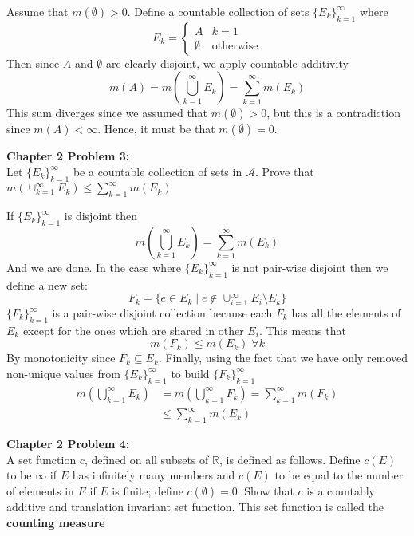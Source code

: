 \documentclass[11pt]{article}
\begin{document}
    Assume that $m(\emptyset) > 0$.
    Define a countable collection of sets $\{ E_k \}_{k=1}^{\infty}$ where
    \[
        E_k = \begin{cases}
                  A & k = 1 \\
                  \emptyset & \text{otherwise}
        \end{cases}
    \]
    Then since $A$ and $\emptyset$ are clearly disjoint, we apply countable additivity
    \[
        m(A) = m \left( \bigcup_{k=1}^{\infty} E_k \right) = \sum_{k=1}^{\infty} m(E_k)
    \]
    This sum diverges since we assumed that $m(\emptyset) > 0$, but this is a contradiction since $m(A) < \infty$.
    Hence, it must be that $m(\emptyset) = 0$.

    \clearpage

    \begin{mybox}
        \textbf{Chapter 2 Problem 3:} \\
        Let $\{ E_k \}_{k=1}^{\infty}$ be a countable collection of sets in $\mathcal{A}$.
        Prove that $m(\cup_{k=1}^{\infty} E_k) \leq \sum_{k=1}^{\infty} m(E_k)$
    \end{mybox}

    If $\{ E_k \}_{k=1}^{\infty}$ is disjoint then
    \[
        m \left( \bigcup_{k=1}^{\infty} E_k \right) = \sum_{k=1}^{\infty} m(E_k)
    \]
    And we are done.
    In the case where $\{ E_k \}_{k=1}^{\infty}$ is not pair-wise disjoint then we define a new set:
    \[
        F_k = \{ e \in E_k \mid e \notin \cup _{i=1}^{\infty} E_i \setminus E_k \}
    \]
    $\{ F_k \}_{k=1}^{\infty}$ is a pair-wise disjoint collection because each $F_k$ has all the elements of $E_k$ except for the ones which are shared in other $E_i$.
    This means that
    \[
        m(F_k) \leq m(E_k) \; \forall k
    \]
    By monotonicity since $F_k \subseteq E_k$.
    Finally, using the fact that we have only removed non-unique values from $\{ E_k \}_{k=1}^{\infty}$ to build $\{ F_k \}_{k=1}^{\infty}$
    \begin{align*}
        m(\bigcup_{k=1}^{\infty} E_k) &= m(\bigcup_{k=1}^{\infty} F_k) = \sum_{k=1}^{\infty} m(F_k) \tag{$F_k$ disjoint} \\
        &\leq \sum_{k=1}^{\infty} m(E_k)
    \end{align*}

    \clearpage

    \begin{mybox}
        \textbf{Chapter 2 Problem 4:} \\
        A set function $c$, defined on all subsets of $\mathbb{R}$, is defined as follows.
        Define $c(E)$ to be $\infty$ if $E$ has infinitely many members and $c(E)$ to be equal to the number of elements in $E$ if $E$ is finite;
        define $c(\emptyset) = 0$.
        Show that $c$ is a countably additive and translation invariant set function.
        This set function is called the \textbf{counting measure}
    \end{mybox}
\end{document}
